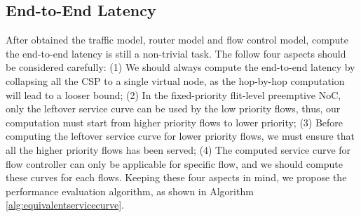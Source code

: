 \documentclass[10pt,journal]{IEEEtran}
\begin{document}
\subsection{End-to-End Latency}\label{e2elatency}
After obtained the traffic model, router model and flow control model, compute the end-to-end latency is still a non-trivial task. The follow four aspects should be considered carefully: (1) We should always compute the end-to-end latency by collapsing all the CSP to a single virtual node, as the hop-by-hop computation will lead to a looser bound; (2) In the fixed-priority flit-level preemptive NoC, only the leftover service curve can be used by the low priority flows, thus, our computation must start from higher priority flows to lower priority; (3) Before computing the leftover service curve for lower priority flows, we must ensure that all the higher priority flows has been served; (4) The computed service curve for flow controller can only be applicable for specific flow, and we should compute these curves for each flows. Keeping these four aspects in mind, we propose the performance evaluation algorithm, as shown in Algorithm \ref{alg:equivalentservicecurve}.
\end{document}
